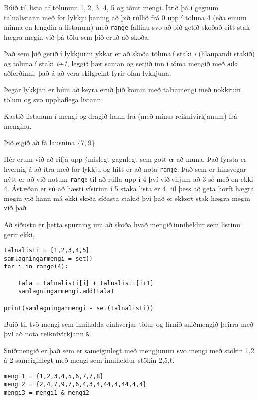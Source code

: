 \begin{exercise}\label{set3}
Búið til lista af tölunum 1, 2, 3, 4, 5 og tómt mengi.
Ítrið þá í gegnum talnalistann með for lykkju þannig að þið rúllið frá 0 upp í töluna 4 (eða einum minna en lengdin á listanum) með \texttt{range} fallinu svo að þið getið skoðað eitt stak hægra megin við þá tölu sem þið eruð að skoða.

Það sem þið gerið í lykkjunni ykkar er að skoða töluna í staki \textit{i} (hlaupandi stakið) og töluna í staki \textit{i+1}, leggið þær saman og setjið inn í tóma mengið með \texttt{add} aðferðinni, það á að vera skilgreint fyrir ofan lykkjuna.

Þegar lykkjan er búin að keyra eruð þið komin með talnamengi með nokkrum tölum og svo upphaflega listann.

Kastið listanum í mengi og dragið hann frá (með mínus reiknivirkjanum) frá menginu.

Þið eigið að fá lausnina \{7, 9\}
\end{exercise}
\begin{Answer}[ref={set3}]
Hér erum við að rifja upp ýmislegt gagnlegt sem gott er að muna.
Það fyrsta er hvernig á að ítra með for-lykkju og hitt er að nota \texttt{range}.
Það sem er hinsvegar nýtt er að við notum \texttt{range} til að rúlla upp í 4 því við viljum að 3 sé með en ekki 4.
Ástæðan er sú að hæsti vísirinn í 5 staka lista er 4, til þess að geta horft hægra megin við hann má ekki skoða síðasta stakið því það er ekkert stak hægra megin við það.

Að síðustu er þetta spurning um að skoða hvað mengið inniheldur sem listinn gerir ekki, 

	\begin{lstlisting}
talnalisti = [1,2,3,4,5]
samlagningarmengi = set()
for i in range(4):

	tala = talnalisti[i] + talnalisti[i+1]
	samlagningarmengi.add(tala)

print(samlagningarmengi - set(talnalisti))\end{lstlisting}
\end{Answer}

\begin{exercise}\label{set4}
Búið til tvö mengi sem innihalda einhverjar tölur og finnið sniðmengið þeirra með því að nota reiknivirkjann \texttt{\&}.
\end{exercise}
\begin{Answer}[ref={set4}]
	Sniðmengið er það sem er sameiginlegt með mengjunum svo mengi með stökin 1,2 á 2 sameiginlegt með mengi sem inniheldur stökin 2,5,6.
\begin{lstlisting}
mengi1 = {1,2,3,4,5,6,7,7,8}
mengi2 = {2,4,7,9,7,6,4,3,4,44,4,44,4,4}
mengi3 = mengi1 & mengi2\end{lstlisting}
\end{Answer}